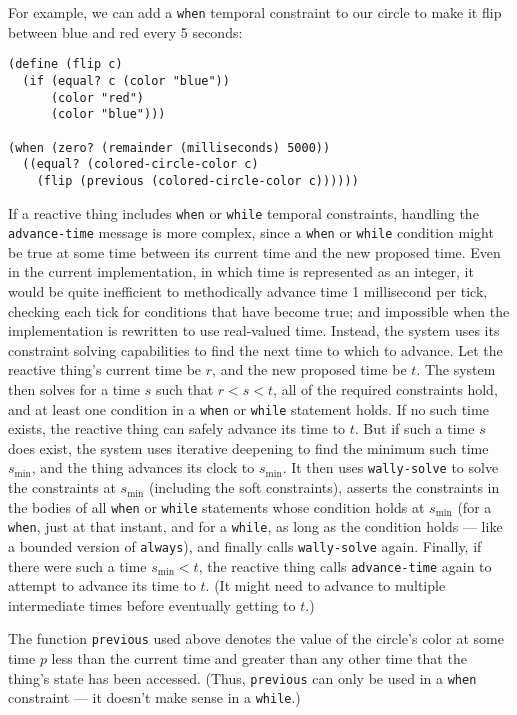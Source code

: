 \documentclass{sig-alternate-05-2015}
\begin{document}
For example, we can add a \verb|when| temporal constraint to our 
circle to make it flip between blue and red every 5 seconds:

\begin{verbatim}
(define (flip c)
  (if (equal? c (color "blue"))
      (color "red")
      (color "blue")))

(when (zero? (remainder (milliseconds) 5000))
  ((equal? (colored-circle-color c) 
    (flip (previous (colored-circle-color c))))))
\end{verbatim}

If a reactive thing includes \verb|when| or \verb|while| temporal
constraints, handling the \verb|advance-time| message is more complex,
since a \verb|when| or \verb|while| condition might be true at some
time between its current time and the new proposed time.  Even in the
current implementation, in which time is represented as an integer, it
would be quite inefficient to methodically advance time 1 millisecond
per tick, checking each tick for conditions that have become true; and
impossible when the implementation is rewritten to use real-valued
time.  Instead, the system uses its constraint solving capabilities to
find the next time to which to advance.  Let the reactive thing's
current time be $r$, and the new proposed time be $t$\@.  The system
then solves for a time $s$ such that $r<s<t$, all of the required
constraints hold, and at least one condition in a \verb|when| or
\verb|while| statement holds.  If no such time exists, the reactive
thing can safely advance its time to $t$\@.  But if such a time $s$
does exist, the system uses iterative deepening to find the minimum
such time $s_{\min}$, and the thing advances its clock to $s_{\min}$.
It then uses \verb|wally-solve| to solve the constraints at $s_{\min}$
(including the soft constraints), asserts the constraints in the
bodies of all \verb|when| or \verb|while| statements whose condition
holds at $s_{\min}$ (for a \verb|when|, just at that instant, and for
a \verb|while|, as long as the condition holds --- like a bounded
version of \verb|always|), and finally calls \verb|wally-solve| again.
Finally, if there were such a time $s_{\min}<t$, the reactive thing
calls \verb|advance-time| again to attempt to advance its time to $t$\@.
(It might need to advance to multiple intermediate times before
eventually getting to $t$.)

The function \verb|previous| used above denotes the value of the circle's
color at some time $p$ less than the current time and greater than any
other time that the thing's state has been accessed.  (Thus,
\verb|previous| can only be used in a \verb|when| constraint --- it doesn't
make sense in a \verb|while|.)
\end{document}
